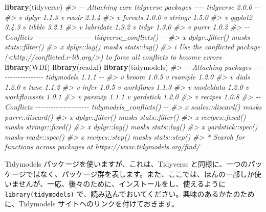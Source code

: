 \documentclass[
  xelatex, ja=standard]{bxjsbook}
\newenvironment{Shaded}{\begin{snugshade}}{\end{snugshade}}
\newcommand{\CommentTok}[1]{\textcolor[rgb]{0.56,0.35,0.01}{\textit{#1}}}
\newcommand{\FunctionTok}[1]{\textcolor[rgb]{0.13,0.29,0.53}{\textbf{#1}}}
\newcommand{\NormalTok}[1]{#1}
\theoremstyle{definition}
\theoremstyle{definition}
\theoremstyle{definition}
\theoremstyle{definition}
\theoremstyle{remark}
\begin{document}
\begin{Shaded}
\begin{Highlighting}[]
\FunctionTok{library}\NormalTok{(tidyverse)}
\CommentTok{\#\textgreater{} {-}{-} Attaching core tidyverse packages {-}{-}{-}{-} tidyverse 2.0.0 {-}{-}}
\CommentTok{\#\textgreater{} v dplyr     1.1.3     v readr     2.1.4}
\CommentTok{\#\textgreater{} v forcats   1.0.0     v stringr   1.5.0}
\CommentTok{\#\textgreater{} v ggplot2   3.4.3     v tibble    3.2.1}
\CommentTok{\#\textgreater{} v lubridate 1.9.2     v tidyr     1.3.0}
\CommentTok{\#\textgreater{} v purrr     1.0.2     }
\CommentTok{\#\textgreater{} {-}{-} Conflicts {-}{-}{-}{-}{-}{-}{-}{-}{-}{-}{-}{-}{-}{-}{-}{-}{-}{-}{-}{-}{-}{-} tidyverse\_conflicts() {-}{-}}
\CommentTok{\#\textgreater{} x dplyr::filter() masks stats::filter()}
\CommentTok{\#\textgreater{} x dplyr::lag()    masks stats::lag()}
\CommentTok{\#\textgreater{} i Use the conflicted package (\textless{}http://conflicted.r{-}lib.org/\textgreater{}) to force all conflicts to become errors}
\FunctionTok{library}\NormalTok{(WDI)}
\FunctionTok{library}\NormalTok{(readxl)}
\FunctionTok{library}\NormalTok{(tidymodels)}
\CommentTok{\#\textgreater{} {-}{-} Attaching packages {-}{-}{-}{-}{-}{-}{-}{-}{-}{-}{-}{-}{-}{-}{-}{-}{-}{-} tidymodels 1.1.1 {-}{-}}
\CommentTok{\#\textgreater{} v broom        1.0.5     v rsample      1.2.0}
\CommentTok{\#\textgreater{} v dials        1.2.0     v tune         1.1.2}
\CommentTok{\#\textgreater{} v infer        1.0.5     v workflows    1.1.3}
\CommentTok{\#\textgreater{} v modeldata    1.2.0     v workflowsets 1.0.1}
\CommentTok{\#\textgreater{} v parsnip      1.1.1     v yardstick    1.2.0}
\CommentTok{\#\textgreater{} v recipes      1.0.8     }
\CommentTok{\#\textgreater{} {-}{-} Conflicts {-}{-}{-}{-}{-}{-}{-}{-}{-}{-}{-}{-}{-}{-}{-}{-}{-}{-}{-}{-}{-} tidymodels\_conflicts() {-}{-}}
\CommentTok{\#\textgreater{} x scales::discard() masks purrr::discard()}
\CommentTok{\#\textgreater{} x dplyr::filter()   masks stats::filter()}
\CommentTok{\#\textgreater{} x recipes::fixed()  masks stringr::fixed()}
\CommentTok{\#\textgreater{} x dplyr::lag()      masks stats::lag()}
\CommentTok{\#\textgreater{} x yardstick::spec() masks readr::spec()}
\CommentTok{\#\textgreater{} x recipes::step()   masks stats::step()}
\CommentTok{\#\textgreater{} * Search for functions across packages at https://www.tidymodels.org/find/}
\end{Highlighting}
\end{Shaded}

Tidymodels パッケージを使いますが、これは、Tidyverse と同様に、一つのパッケージではなく、パッケージ群を表します。また、ここでは、ほんの一部しか使いませんが、一応、後々のために、インストールをし、使えるように \texttt{library(tidymodels)} で、読み込んでおいてください。興味のあるかたのために、Tidymodels サイトへのリンクを付けておきます。
\end{document}
